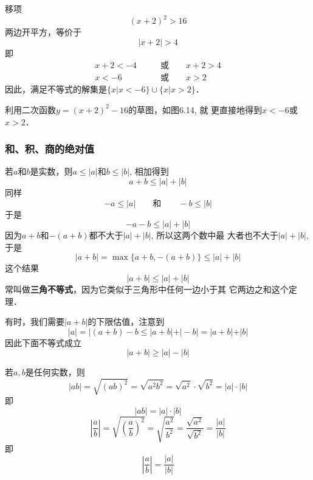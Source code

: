 \begin{solution}
    移项
\[(x+2)^2>16\]
    两边开平方，等价于
    \[|x+2|>4\]
    即
    \[\begin{split}
        x+2<-4\qquad &\text{或}\qquad x+2>4\\  x<-6\qquad &\text{或}\qquad x>2
    \end{split}\]
因此，满足不等式的解集是$\{x|x<-6\}\cup\{x|x>2\}$．

利用二次函数$y=(x+2)^2-16$的草图，如图6.14, 就
更直接地得到$x<-6$或$x>2$．
\begin{figure}[htp]
    \centering
{}

    \caption{}
\end{figure}
\end{solution}

\subsubsection{和、积、商的绝对值}
若$a$和$b$是实数，则$a\le |a|$和$b\le |b|$, 相加得到
\[a+b\le  |a|+|b|\]
同样
\[-a\le |a|\qquad \text{和}\qquad -b\le |b|\]
于是
\[-a-b\le |a|+|b|\]
因为$a+b$和$-(a+b)$都不大于$|a|+|b|$, 所以这两个数中最
大者也不大于$|a|+|b|$, 于是
\[|a+b|=\max\{a+b,-(a+b)\}\le |a|+|b|\]
这个结果
\begin{equation}
    |a+b|\le |a|+|b|
\end{equation}
常叫做\textbf{三角不等式}，因为它类似于三角形中任何一边小于其
它两边之和这个定理．

有时，我们需要$|a+b|$的下限估值，注意到
\[|a|=|(a+b)-b\le |a+b| +|-b| =|a+b| +|b|\]
因此下面不等式成立
\begin{equation}
    |a+b|\ge |a|-|b|
\end{equation}

若$a,b$是任何实数，则
\[|ab|=\sqrt{(ab)^2}=\sqrt{a^2b^2}=\sqrt{a^2}\cdot \sqrt{b^2}=|a|\cdot |b|\]
即
\begin{equation}
    |ab|=|a|\cdot |b|
\end{equation}
\[\left|\frac{a}{b}\right|=\sqrt{\left(\frac{a}{b}\right)^2}=\sqrt{\frac{a^2}{b^2}}=\frac{\sqrt{a^2}}{\sqrt{b^2}}=\frac{|a|}{|b|}\]
即
\begin{equation}
    \left|\frac{a}{b}\right|=\frac{|a|}{|b|}
\end{equation}

